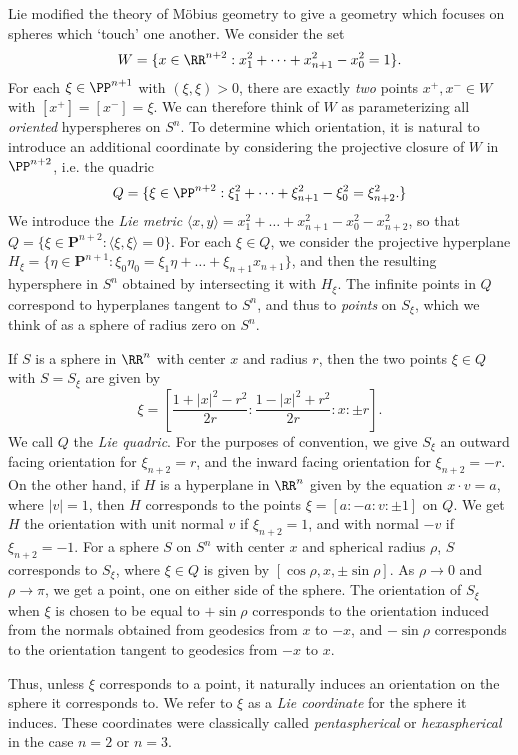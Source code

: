 Lie modified the theory of M\"{o}bius geometry to give a geometry which focuses on spheres which `touch' one another. We consider the set
%
\[ W = \{ x \in \RR^{n+2} : x_1^2 + \dots + x_{n+1}^2 - x_0^2 = 1 \}. \]
%
For each $\xi \in \PP^{n+1}$ with $(\xi,\xi) > 0$, there are exactly \emph{two} points $x^+, x^- \in W$ with $[x^+] = [x^-] = \xi$. We can therefore think of $W$ as parameterizing all \emph{oriented} hyperspheres on $S^n$. To determine which orientation, it is natural to introduce an additional coordinate by considering the projective closure of $W$ in $\PP^{n+2}$, i.e. the quadric
%
\[ Q = \{ \xi \in \PP^{n+2} : \xi_1^2 + \dots + \xi_{n+1}^2 - \xi_0^2 = \xi_{n+2}^2. \} \]
%
We introduce the \emph{Lie metric} $\langle x,y \rangle = x_1^2 + \dots + x_{n+1}^2 - x_0^2 - x_{n+2}^2$, so that $Q = \{ \xi \in \mathbf{P}^{n+2} : \langle \xi, \xi \rangle = 0 \}$. For each $\xi \in Q$, we consider the projective hyperplane $H_\xi = \{ \eta \in \mathbf{P}^{n+1}: \xi_0 \eta_0 = \xi_1 \eta + \dots + \xi_{n+1} x_{n+1} \}$, and then the resulting hypersphere in $S^n$ obtained by intersecting it with $H_\xi$. The infinite points in $Q$ correspond to hyperplanes tangent to $S^n$, and thus to \emph{points} on $S_\xi$, which we think of as a sphere of radius zero on $S^n$.

If $S$ is a sphere in $\RR^n$ with center $x$ and radius $r$, then the two points $\xi \in Q$ with $S = S_\xi$ are given by
%
\[ \xi = \left[ \frac{1 + |x|^2 - r^2}{2r}: \frac{1 - |x|^2 + r^2}{2r}: x: \pm r \right]. \]
%
We call $Q$ the \emph{Lie quadric}. For the purposes of convention, we give $S_\xi$ an outward facing orientation for $\xi_{n+2} = r$, and the inward facing orientation for $\xi_{n+2} = -r$. On the other hand, if $H$ is a hyperplane in $\RR^n$ given by the equation $x \cdot v = a$, where $|v| = 1$, then $H$ corresponds to the points $\xi = [a:-a:v: \pm 1]$ on $Q$. We get $H$ the orientation with unit normal $v$ if $\xi_{n+2} = 1$, and with normal $-v$ if $\xi_{n+2} = -1$. For a sphere $S$ on $S^n$ with center $x$ and spherical radius $\rho$, $S$ corresponds to $S_\xi$, where $\xi \in Q$ is given by $[\cos \rho, x, \pm \sin \rho]$. As $\rho \to 0$ and $\rho \to \pi$, we get a point, one on either side of the sphere. The orientation of $S_\xi$ when $\xi$ is chosen to be equal to $+ \sin \rho$ corresponds to the orientation induced from the normals obtained from geodesics from $x$ to $-x$, and $- \sin \rho$ corresponds to the orientation tangent to geodesics from $-x$ to $x$.

Thus, unless $\xi$ corresponds to a point, it naturally induces an orientation on the sphere it corresponds to. We refer to $\xi$ as a \emph{Lie coordinate} for the sphere it induces. These coordinates were classically called \emph{pentaspherical} or \emph{hexaspherical} in the case $n = 2$ or $n = 3$.

